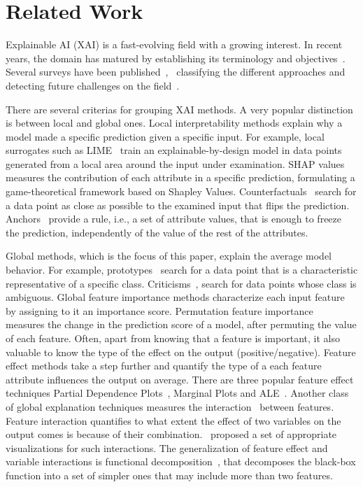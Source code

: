 \documentclass[wcp]{jmlr}
\begin{document}
\section{Related Work}
\label{sec:2-related}

Explainable AI (XAI) is a fast-evolving field with a growing
interest. In recent years, the domain has matured by establishing its
terminology and objectives~\citep{Hoffman2018}. Several surveys have
been published~\citep{BarredoArrieta2020},~\citep{Adadi2018} classifying
the different approaches and detecting future challenges on the
field~\citep{Molnar2020}.

There are several criterias for grouping XAI methods. A very popular
distinction is between local and global ones. Local interpretability
methods explain why a model made a specific prediction given a
specific input. For example, local surrogates such as
LIME~\citep{Ribeiro2016} train an explainable-by-design model in data
points generated from a local area around the input under
examination. SHAP values~\citep{Lundberg2017} measures the contribution
of each attribute in a specific prediction, formulating a
game-theoretical framework based on Shapley
Values. Counterfactuals~\citep{Wachter2017} search for a data point as
close as possible to the examined input that flips the
prediction. Anchors~\citep{Ribeiro2018} provide a rule, i.e., a set of
attribute values, that is enough to freeze the prediction,
independently of the value of the rest of the attributes.


Global methods, which is the focus of this paper, explain the average
model behavior. For example, prototypes~\citep{Gurumoorthy2019} search
for a data point that is a characteristic representative of a specific
class. Criticisms~\citep{Kim2016}, search for data points whose class
is ambiguous. Global feature importance methods characterize each
input feature by assigning to it an importance score. Permutation
feature importance~\citep{Fisher2019} measures the change in the
prediction score of a model, after permuting the value of each
feature. Often, apart from knowing that a feature is important, it
also valuable to know the type of the effect on the output
(positive/negative). Feature effect methods take a step further and
quantify the type of a each feature attribute influences the output on
average. There are three popular feature effect techniques Partial
Dependence Plots~\citep{Friedman2001}, Marginal Plots and
ALE~\citep{Apley2020}. Another class of global explanation techniques
measures the interaction~\citep{Friedman2008} between features. Feature
interaction quantifies to what extent the effect of two variables on
the output comes is because of their combination.~\cite{Friedman2008}
proposed a set of appropriate visualizations for such
interactions. The generalization of feature effect and variable
interactions is functional decomposition~\citep{Molnar2021}, that
decomposes the black-box function into a set of simpler ones that may
include more than two features.
\end{document}

